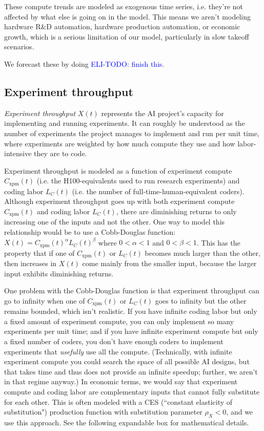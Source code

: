 \documentclass{article}
\theoremstyle{definition}
\newcommand{\ETODO}[1]{\textcolor{blue}{ELI-TODO: #1}}
\begin{document}
These compute trends are modeled as exogenous time series, i.e. they're not affected by what else is going on in the model. This means we aren't modeling hardware R\&D automation, hardware production automation, or economic growth, which is a serious limitation of our model, particularly in slow takeoff scenarios.

We forecast these by doing \ETODO{finish this}.

\subsection{Experiment throughput} \label{Experiment throughput}

\textit{Experiment throughput} $X(t)$ represents the AI project's capacity for implementing and running experiments. It can roughly be understood as the number of experiments the project manages to implement and run per unit time, where experiments are weighted by how much compute they use and how labor-intensive they are to code.

Experiment throughput is modeled as a function of experiment compute $C_\text{xpm}(t)$ (i.e. the H100-equivalents used to run research experiments) and coding labor $L_C(t)$ (i.e. the number of full-time-human-equivalent coders). Although experiment throughput goes up with both experiment compute $C_{\text{xpm}}(t)$ and coding labor $L_C(t)$, there are diminishing returns to only increasing one of the inputs and not the other. One way to model this relationship would be to use a Cobb-Douglas function: $X(t) = C_\text{xpm}(t)^\alpha L_C(t)^\beta$ where $0 < \alpha < 1$ and $0 < \beta < 1$. This has the property that if one of $C_\text{xpm}(t)$ or $L_C(t)$ becomes much larger than the other, then increases in $X(t)$ come mainly from the smaller input, because the larger input exhibits diminishing returns.

One problem with the Cobb-Douglas function is that experiment throughput can go to infinity when one of $C_{\text{xpm}}(t)$ or $L_C(t)$ goes to infinity but the other remains bounded, which isn't realistic. If you have infinite coding labor but only a fixed amount of experiment compute, you can only implement so many experiments per unit time; and if you have infinite experiment compute but only a fixed number of coders, you don't have enough coders to implement experiments that \textit{usefully} use all the compute. (Technically, with infinite experiment compute you could search the space of all possible AI designs, but that takes time and thus does not provide an infinite speedup; further, we aren't in that regime anyway.) In economic terms, we would say that experiment compute and coding labor are complementary inputs that cannot fully substitute for each other. This is often modeled with a CES (``constant elasticity of substitution") production function with substitution parameter $\rho_X < 0$, and we use this approach. See the following expandable box for mathematical details.
\end{document}
